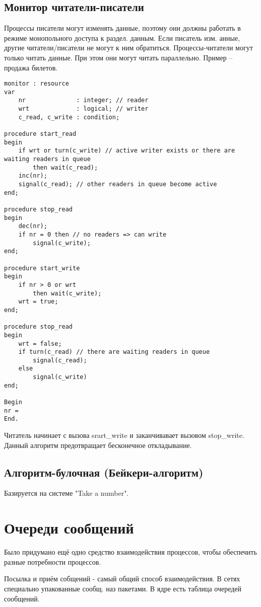 \section{Монитор читатели-писатели}
Процессы писатели могут изменять данные, поэтому они должны работать  в режиме монопольного доступа к раздел. данным. Если писатель изм. анные, другие читатели/писатели не могут к ним обратиться.
Процессы-читатели могут только читать данные. При этом они могут читать параллельно.
Пример -- продажа билетов.

\begin{lstlisting}[label=lst:RWMonitor,caption=Код монитора читатели-писатели]
monitor : resource
var
	nr              : integer; // reader
	wrt             : logical; // writer
	c_read, c_write : condition;
	
procedure start_read
begin
	if wrt or turn(c_write) // active writer exists or there are waiting readers in queue
		then wait(c_read);
	inc(nr);
	signal(c_read); // other readers in queue become active
end;

procedure stop_read
begin
	dec(nr);
	if nr = 0 then // no readers => can write
		signal(c_write);
end;

procedure start_write
begin
	if nr > 0 or wrt
		then wait(c_write);
	wrt = true;
end;

procedure stop_read
begin
	wrt = false;
	if turn(c_read) // there are waiting readers in queue
		signal(c_read);
	else 
		signal(c_write)
end;

Begin
nr = 
End.
\end{lstlisting}

Читатель начинает с вызова srart\_write и заканчивавает вызовом stop\_write. 
Данный алгоритм предотвращает бесконечное откладывание.

\section{Алгоритм-булочная (Бейкери-алгоритм)}
Базируется на системе "Take a number".

\chapter{Очереди сообщений}
Было придумано ещё одно средство взаимодействия процессов, чтобы обеспечить разные потребности процессов. 

Посылка и приём собщений - самый общий способ взаимодействия. В сетях специально упакованные сообщ. наз пакетами. В ядре есть таблица очередей сообщений.

